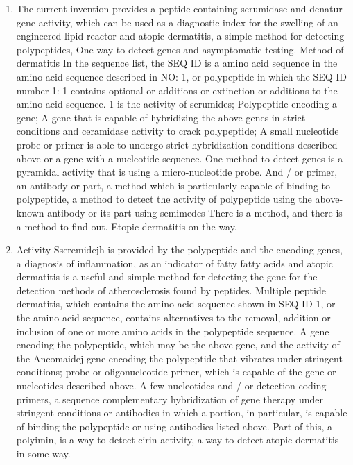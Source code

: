 \documentclass{article}
\begin{document}
\begin{enumerate}
\item 
The current invention provides a peptide-containing serumidase and denatur gene activity, which can be used as a diagnostic index for the swelling of an engineered lipid reactor and atopic dermatitis, a simple method for detecting polypeptides, One way to detect genes and asymptomatic testing. Method of dermatitis In the sequence list, the SEQ ID is a amino acid sequence in the amino acid sequence described in NO: 1, or polypeptide in which the SEQ ID number 1: 1 contains optional or additions or extinction or additions to the amino acid sequence. 1 is the activity of serumides; Polypeptide encoding a gene; A gene that is capable of hybridizing the above genes in strict conditions and ceramidase activity to crack polypeptide; A small nucleotide probe or primer is able to undergo strict hybridization conditions described above or a gene with a nucleotide sequence. One method to detect genes is a pyramidal activity that is using a micro-nucleotide probe. And / or primer, an antibody or part, a method which is particularly capable of binding to polypeptide, a method to detect the activity of polypeptide using the above-known antibody or its part using semimedes There is a method, and there is a method to find out. Etopic dermatitis on the way.


\item 
Activity Sseremidejh is provided by the polypeptide and the encoding genes, a diagnosis of inflammation, as an indicator of fatty fatty acids and atopic dermatitis is a useful and simple method for detecting the gene for the detection methods of atherosclerosis found by peptides. Multiple peptide dermatitis, which contains the amino acid sequence shown in SEQ ID 1, or the amino acid sequence, contains alternatives to the removal, addition or inclusion of one or more amino acids in the polypeptide sequence. A gene encoding the polypeptide, which may be the above gene, and the activity of the Ancomaidej gene encoding the polypeptide that vibrates under stringent conditions; probe or oligonucleotide primer, which is capable of the gene or nucleotides described above. A few nucleotides and / or detection coding primers, a sequence complementary hybridization of gene therapy under stringent conditions or antibodies in which a portion, in particular, is capable of binding the polypeptide or using antibodies listed above. Part of this, a polyimin, is a way to detect cirin activity, a way to detect atopic dermatitis in some way.




\end{enumerate}
\end{document}

